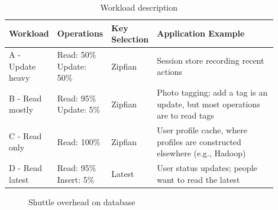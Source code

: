 \begin{table}[ht]
\centering
\begin{tabular}{p{0.18\linewidth}p{0.15\linewidth}p{0.09\linewidth}p{0.48\linewidth}}
\textbf{Workload}       & \textbf{Operations}                   & \textbf{Key \newline Selection} & \textbf{Application Example} \\ \hline
A - Update heavy        & Read: 50\% \newline Update: 50\%               & Zipfian                & Session store recording recent actions\\ \hline
B - Read mostly         & Read: 95\% \newline Update: 5\%                & Zipfian                & Photo tagging; add a tag is an update, but most operations are to read tags\\ \hline
C - Read only           & Read: 100\%                           & Zipfian                & User profile cache, where profiles are constructed elsewhere (e.g., Hadoop)\\ \hline
D - Read latest         & Read: 95\% \newline Insert: 5\%                & Latest                 & User status updates; people want to read the latest \\ \hline

\end{tabular}
\caption{Workload description}
\label{tab:workload_description}
\end{table}


\begin{figure}[!htb]
  \centering



  \caption{Shuttle overhead on database}
  \label{fig:database_overhead_workloads}
\end{figure}

